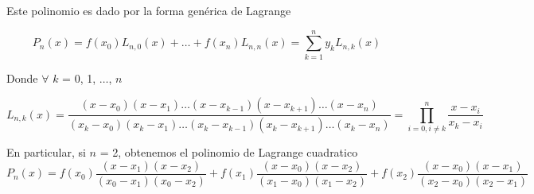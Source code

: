 Este polinomio es dado por la forma genérica de Lagrange

\begin{equation}
	P_n(x) = f(x_0)L_{n, 0}(x) + \dots + f(x_n)L_{n,n}(x) = \sum_{k=1}^{n} y_kL_{n,k}(x) 
\end{equation}

Donde $\forall$ $k$ = 0, 1, $\dots$, $n$

\begin{equation}
	L_{n,k}(x) = \dfrac{(x - x_0)(x - x_1)\dots(x - x_{k-1})(x - x_{k+1})\dots(x - x_n)}{(x_k - x_0)(x_k - x_1)\dots(x_k - x_{k-1})(x_k - x_{k+1})\dots(x_k - x_n)} = \prod_{i=0, i \neq k}^{n} \dfrac{x - x_i}{x_k - x_i}
\end{equation}

En particular, si $n$ = 2, obtenemos el polinomio de Lagrange cuadratico
\begin{equation}
	P_n(x) = f(x_0)\dfrac{(x - x_1)(x - x_2)}{(x_0 - x_1)(x_0 - x_2)} + f(x_1)\dfrac{(x - x_0)(x - x_2)}{(x_1 - x_0)(x_1 - x_2)} + f(x_2)\dfrac{(x - x_0)(x - x_1)}{(x_2 - x_0)(x_2 - x_1)} 
\end{equation}




